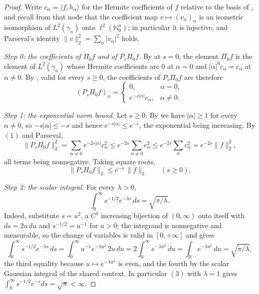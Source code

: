 \begin{proof}
Write $c_\alpha = \langle f, h_\alpha\rangle$ for the Hermite coefficients of $f$
relative to the basis of , and recall from that node that
the coefficient map $v \mapsto (v_\alpha)_\alpha$ is an isometric isomorphism of
$L^2(\gamma_n)$ onto $\ell^2(\mathbb{N}_0^n)$; in particular it is injective, and
Parseval's identity $\|v\|_2^2 = \sum_\alpha |v_\alpha|^2$ holds.

\emph{Step 0: the coefficients of $\Pi_0 f$ and of $P_s\Pi_0 f$.}
By  at $s = 0$, the element $\Pi_0 f$ is the element of
$L^2(\gamma_n)$ whose Hermite coefficients are $0$ at $\alpha = 0$ and
$|\alpha|^0 c_\alpha = c_\alpha$ at $\alpha \neq 0$.  By
, valid for every $s \geq 0$, the coefficients of
$P_s\Pi_0 f$ are therefore
\begin{equation*}
  (P_s\Pi_0f)_\alpha =
  \begin{cases}
    0, & \alpha = 0, \\
    e^{-s|\alpha|}c_\alpha, & \alpha \neq 0 .
  \end{cases}
  \tag{1}
\end{equation*}

\emph{Step 1: the exponential norm bound.}
Let $s \geq 0$.  By  we have $|\alpha| \geq 1$ for
every $\alpha \neq 0$, so $-s|\alpha| \leq -s$ and hence
$e^{-s|\alpha|} \leq e^{-s}$, the exponential being increasing.  By $(1)$ and
Parseval,
\begin{equation*}
  \|P_s\Pi_0f\|_2^2 = \sum_{\alpha\neq0} e^{-2s|\alpha|}c_\alpha^2
    \leq e^{-2s}\sum_{\alpha\neq0}c_\alpha^2
    \leq e^{-2s}\sum_{\alpha}c_\alpha^2 = e^{-2s}\|f\|_2^2 ,
\end{equation*}
all terms being nonnegative.  Taking square roots,
\begin{equation*}
  \|P_s\Pi_0f\|_2 \leq e^{-s}\,\|f\|_2 \qquad (s \geq 0). \tag{2}
\end{equation*}

\emph{Step 2: the scalar integral.}
For every $\lambda > 0$,
\begin{equation*}
  \int_0^\infty s^{-1/2}e^{-\lambda s}\,ds = \sqrt{\pi/\lambda} . \tag{3}
\end{equation*}
Indeed, substitute $s = u^2$, a $C^1$ increasing bijection of $(0,\infty)$ onto
itself with $ds = 2u\,du$ and $s^{-1/2} = u^{-1}$ for $u > 0$; the integrand is
nonnegative and measurable, so the change of variables is valid in $[0,+\infty]$
and gives
\[
  \int_0^\infty s^{-1/2}e^{-\lambda s}\,ds
    = \int_0^\infty u^{-1}e^{-\lambda u^2}\,2u\,du
    = 2\int_0^\infty e^{-\lambda u^2}\,du
    = \int_{\mathbb{R}} e^{-\lambda u^2}\,du
    = \sqrt{\pi/\lambda} ,
\]
the third equality because $u \mapsto e^{-\lambda u^2}$ is even, and the fourth
by the scalar Gaussian integral of the shared context.  In particular $(3)$ with
$\lambda = 1$ gives $\int_0^\infty s^{-1/2}e^{-s}ds = \sqrt\pi < \infty$.


\end{proof}
